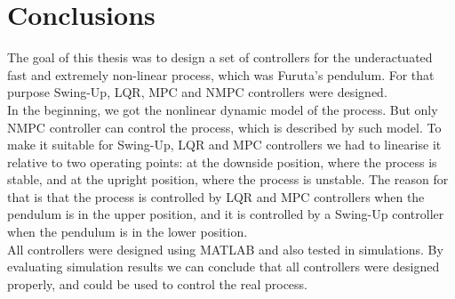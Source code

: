 \chapter{Conclusions}
The goal of this thesis was to design a set of controllers for the underactuated fast and extremely non-linear process, which was Furuta's pendulum. For that purpose Swing-Up, LQR, MPC and NMPC controllers were designed.\\
In the beginning, we got the nonlinear dynamic model of the process. But only NMPC controller can control the process, which is described by such model. To make it suitable for Swing-Up, LQR and MPC controllers we had to linearise it relative to two operating points: at the downside position, where the process is stable, and at the upright position, where the process is unstable. The reason for that is that the process is controlled by LQR and MPC controllers when the pendulum is in the upper position, and it is controlled by a Swing-Up controller when the pendulum is in the lower position.\\
All controllers were designed using MATLAB and also tested in simulations. By evaluating simulation results we can conclude that all controllers were designed properly, and could be used to control the real process. 
